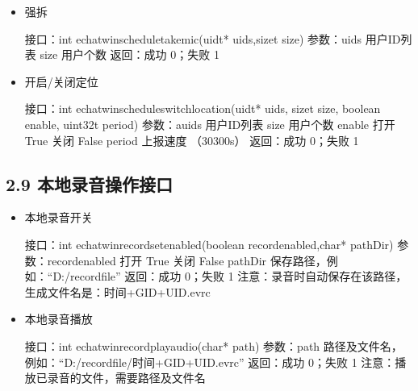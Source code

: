 \documentclass[letterpaper,10pt,english]{sphinxmanual}
\begin{document}
\begin{itemize}
\item {} 
强拆

%
\begin{sphinxVerbatim}[commandchars=\\\{\}]
接口：int echat\PYGZus{}win\PYGZus{}schedule\PYGZus{}takemic(uid\PYGZus{}t* uids,size\PYGZus{}t size)
参数：uids  用户ID列表
  size  用户个数
返回：成功 0；失败 \PYGZhy{}1
\end{sphinxVerbatim}

\item {} 
开启/关闭定位

%
\begin{sphinxVerbatim}[commandchars=\\\{\}]
接口：int echat\PYGZus{}win\PYGZus{}schedule\PYGZus{}switch\PYGZus{}location(uid\PYGZus{}t* uids, size\PYGZus{}t size, boolean enable, uint32\PYGZus{}t period)
参数：auids  用户ID列表
  size  用户个数
  enable  打开 True  关闭  False
  period  上报速度 （30\PYGZti{}300s）
返回：成功 0；失败 \PYGZhy{}1
\end{sphinxVerbatim}

\end{itemize}


\subsection{2.9 本地录音操作接口}
\label{\detokenize{c_win:id11}}\begin{itemize}
\item {} 
本地录音开关

%
\begin{sphinxVerbatim}[commandchars=\\\{\}]
接口：int echat\PYGZus{}win\PYGZus{}record\PYGZus{}set\PYGZus{}enabled(boolean record\PYGZus{}enabled,char* pathDir)
参数：record\PYGZus{}enabled  打开 True   关闭 False
  pathDir  保存路径，例如：“D:/record\PYGZus{}file”
返回：成功 0；失败 \PYGZhy{}1
注意：录音时自动保存在该路径，生成文件名是：时间+GID+UID.evrc
\end{sphinxVerbatim}

\item {} 
本地录音播放

%
\begin{sphinxVerbatim}[commandchars=\\\{\}]
接口：int echat\PYGZus{}win\PYGZus{}record\PYGZus{}play\PYGZus{}audio(char* path)
参数：path  路径及文件名，例如：“D:/record\PYGZus{}file/时间+GID+UID.evrc”
返回：成功 0；失败 \PYGZhy{}1
注意：播放已录音的文件，需要路径及文件名
\end{sphinxVerbatim}

\end{itemize}
\end{document}

